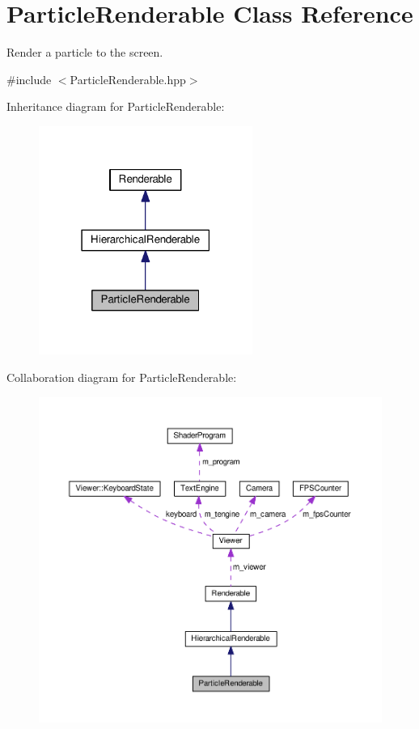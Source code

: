 \hypertarget{classParticleRenderable}{\section{Particle\+Renderable Class Reference}
\label{classParticleRenderable}
}


Render a particle to the screen.  




{\ttfamily \#include $<$Particle\+Renderable.\+hpp$>$}



Inheritance diagram for Particle\+Renderable\+:\nopagebreak
\begin{figure}[H]
\begin{center}
\leavevmode
\includegraphics[width=198pt]{classParticleRenderable__inherit__graph}
\end{center}
\end{figure}


Collaboration diagram for Particle\+Renderable\+:\nopagebreak
\begin{figure}[H]
\begin{center}
\leavevmode
\includegraphics[width=350pt]{classParticleRenderable__coll__graph}
\end{center}
\end{figure}
